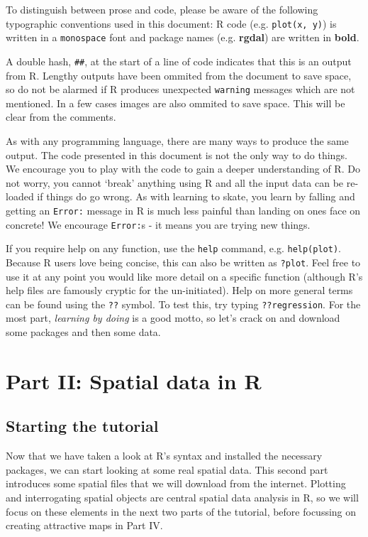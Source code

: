 \documentclass[]{article}
\begin{document}
To distinguish between prose and code, please be aware of the following
typographic conventions used in this document: R code (e.g.
\texttt{plot(x, y)}) is written in a \texttt{monospace} font and package
names (e.g. \textbf{rgdal}) are written in \textbf{bold}.

A double hash, \texttt{\#\#}, at the start of a line of code indicates
that this is an output from R. Lengthy outputs have been ommited from
the document to save space, so do not be alarmed if R produces
unexpected \texttt{warning} messages which are not mentioned. In a few
cases images are also ommited to save space. This will be clear from the
comments.

As with any programming language, there are many ways to produce the
same output. The code presented in this document is not the only way to
do things. We encourage you to play with the code to gain a deeper
understanding of R. Do not worry, you cannot `break' anything using R
and all the input data can be re-loaded if things do go wrong. As with
learning to skate, you learn by falling and getting an \texttt{Error:}
message in R is much less painful than landing on ones face on concrete!
We encourage \texttt{Error:}s - it means you are trying new things.

If you require help on any function, use the \texttt{help} command, e.g.
\texttt{help(plot)}. Because R users love being concise, this can also
be written as \texttt{?plot}. Feel free to use it at any point you would
like more detail on a specific function (although R's help files are
famously cryptic for the un-initiated). Help on more general terms can
be found using the \texttt{??} symbol. To test this, try typing
\texttt{??regression}. For the most part, \emph{learning by doing} is a
good motto, so let's crack on and download some packages and then some
data.

\clearpage

\section{Part II: Spatial data in R}\label{part-ii-spatial-data-in-r}

\subsection{Starting the tutorial}\label{starting-the-tutorial}

Now that we have taken a look at R's syntax and installed the necessary
packages, we can start looking at some real spatial data. This second
part introduces some spatial files that we will download from the
internet. Plotting and interrogating spatial objects are central spatial
data analysis in R, so we will focus on these elements in the next two
parts of the tutorial, before focussing on creating attractive maps in
Part IV.
\end{document}
